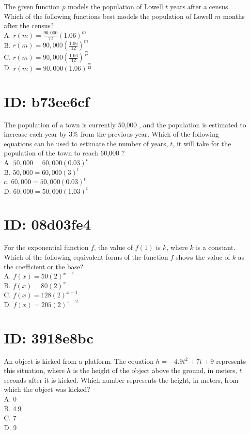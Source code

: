 The given function $p$ models the population of Lowell $t$ years after a census. Which of the following functions best models the population of Lowell $m$ months after the census?\\
A. $r(m)=\frac{90,000}{12}(1.06)^{m}$\\
B. $r(m)=90,000\left(\frac{1.06}{12}\right)^{m}$\\
C. $r(m)=90,000\left(\frac{1.06}{12}\right)^{\frac{m}{12}}$\\
D. $r(m)=90,000(1.06)^{\frac{m}{12}}$

\section*{ID: b73ee6cf}
The population of a town is currently 50,000 , and the population is estimated to increase each year by $3 \%$ from the previous year. Which of the following equations can be used to estimate the number of years, $t$, it will take for the population of the town to reach 60,000 ?\\
A. $50,000=60,000(0.03)^{t}$\\
B. $50,000=60,000(3)^{t}$\\
c. $60,000=50,000(0.03)^{t}$\\
D. $60,000=50,000(1.03)^{t}$

\section*{ID: 08d03fe4}
For the exponential function $f$, the value of $f(1)$ is $k$, where $k$ is a constant. Which of the following equivalent forms of the function $f$ shows the value of $k$ as the coefficient or the base?\\
A. $f(x)=50(2)^{x+1}$\\
B. $f(x)=80(2)^{x}$\\
C. $f(x)=128(2)^{x-1}$\\
D. $f(x)=205(2)^{x-2}$

\section*{ID: 3918e8bc}
An object is kicked from a platform. The equation $h=-4.9 t^{2}+7 t+9$ represents this situation, where $h$ is the height of the object above the ground, in meters, $t$ seconds after it is kicked. Which number represents the height, in meters, from which the object was kicked?\\
A. 0\\
B. 4.9\\
C. 7\\
D. 9

